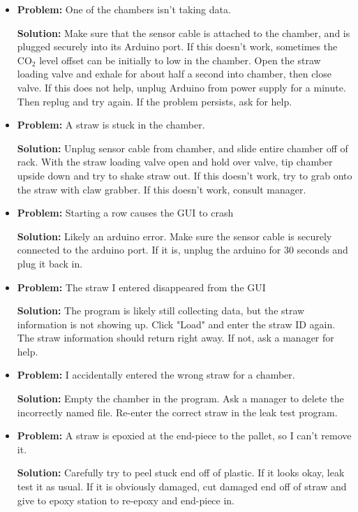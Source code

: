 \documentclass[A4,12pt]{article}
\begin{document}
\begin{itemize}
	\item {\bf Problem:} One of the chambers isn't taking data.
		\begin{adjustwidth}{1cm}{}
		{\bf Solution:} Make sure that the sensor cable is attached to the chamber, and is plugged securely into its Arduino port. If this doesn't work, sometimes the CO$_2$ level offset can be initially to low in the chamber. Open the straw loading valve and exhale for about half a second into chamber, then close valve. If this does not help, unplug Arduino from power supply for a minute. Then replug and try again. If the problem persists, ask for help.
		\end{adjustwidth}
\item {\bf Problem:} A straw is stuck in the chamber.
		\begin{adjustwidth}{1cm}{}
		{\bf Solution:} Unplug sensor cable from chamber, and slide entire chamber off of rack. With the straw loading valve open and hold over valve, tip chamber upside down and try to shake straw out. If this doesn't work, try to grab onto the straw with claw grabber. If this doesn't work, consult manager.
		\end{adjustwidth}
        \item {\bf Problem:} Starting a row causes the GUI to crash
		\begin{adjustwidth}{1cm}{}
		{\bf Solution:} Likely an arduino error.  Make sure the sensor cable is securely connected to the arduino port.  If it is, unplug the arduino for 30 seconds and plug it back in.
		\end{adjustwidth}
        \item {\bf Problem:} The straw I entered disappeared from the GUI
		\begin{adjustwidth}{1cm}{}
		{\bf Solution:} The program is likely still collecting data, but the straw information is not showing up.  Click "Load" and enter the straw ID again.  The straw information should return right away.  If not, ask a manager for help.
		\end{adjustwidth}
	\item {\bf Problem:} I accidentally entered the wrong straw for a chamber.
		\begin{adjustwidth}{1cm}{}
		{\bf Solution:} Empty the chamber in the program. Ask a manager to delete the incorrectly named file. Re-enter the correct straw in the leak test program.
		\end{adjustwidth}
\newpage		
\item {\bf Problem:} A straw is epoxied at the end-piece to the pallet, so I can't remove it.
		\begin{adjustwidth}{1cm}{}
		{\bf Solution:} Carefully try to peel stuck end off of plastic. If it looks okay, leak test it as usual. If it is obviously damaged, cut damaged end off of straw and give to epoxy station to re-epoxy and end-piece in.
		\end{adjustwidth}
		

\end{itemize}
\end{document}
